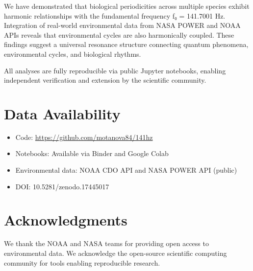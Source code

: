 \documentclass[11pt,a4paper]{article}
\begin{document}
We have demonstrated that biological periodicities across multiple species exhibit harmonic relationships with the fundamental frequency f₀ = 141.7001 Hz. Integration of real-world environmental data from NASA POWER and NOAA APIs reveals that environmental cycles are also harmonically coupled. These findings suggest a universal resonance structure connecting quantum phenomena, environmental cycles, and biological rhythms.

All analyses are fully reproducible via public Jupyter notebooks, enabling independent verification and extension by the scientific community.

\section{Data Availability}

\begin{itemize}
    \item Code: \url{https://github.com/motanova84/141hz}
    \item Notebooks: Available via Binder and Google Colab
    \item Environmental data: NOAA CDO API and NASA POWER API (public)
    \item DOI: 10.5281/zenodo.17445017
\end{itemize}

\section{Acknowledgments}

We thank the NOAA and NASA teams for providing open access to environmental data. We acknowledge the open-source scientific computing community for tools enabling reproducible research.
\end{document}
